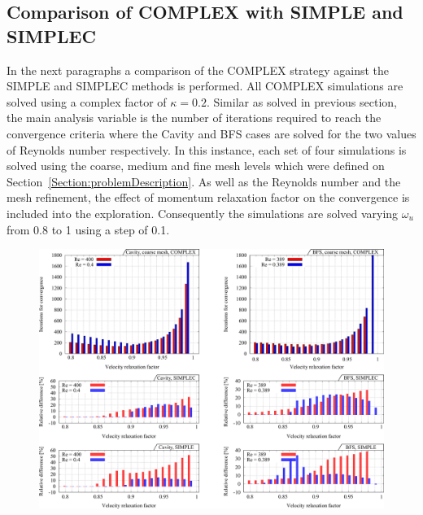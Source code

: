 \documentclass[final,3p,times,11pt,onecolumn]{myElsarticle}
\numberwithin{equation}{section}
\begin{document}
\subsection{Comparison of COMPLEX with SIMPLE and SIMPLEC}
In the next paragraphs a comparison of the COMPLEX strategy against the SIMPLE and SIMPLEC methods is performed. All COMPLEX	 simulations are solved using a complex factor of $\kappa = 0.2$. 
Similar as solved in previous section, the main analysis variable is the number of iterations required to reach the convergence criteria where the Cavity and BFS cases are solved for the two values of Reynolds number respectively. In this instance, each set of four simulations is solved using the coarse, medium and fine mesh levels which were defined on Section~\ref{Section:problemDescription}. As well as the Reynolds number and the mesh refinement, the effect of momentum relaxation factor on the convergence is included into the exploration. Consequently the simulations are solved varying $\omega_u$ from 0.8 to 1 using a step of 0.1.
\begin{figure}[t!]
\centering
\includegraphics[width=17cm]{fig/Results/complexCoarse.pdf}
\caption{}
\label{Fig:complexCoarse}
\end{figure}
\end{document}
